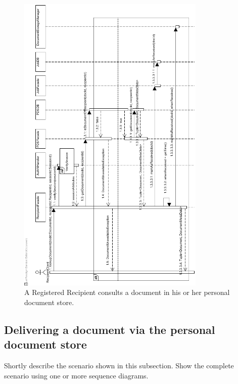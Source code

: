 \documentclass[a4paper,10pt]{article}
\begin{document}
\begin{figure}[!htp]
    \centering
    \includegraphics[width=0.8\textwidth]{Seq_UC14ConsultDocumentInPDS.png}
    \caption{A Registered Recipient consults a document in his or her personal document store.
        }\label{fig:seq_UC14ConsultdocumentInPDS}
\end{figure}

\FloatBarrier

\subsection{Delivering a document via the personal document store}
Shortly describe the scenario shown in this subsection.
Show the complete scenario using one or more sequence diagrams.
\end{document}
